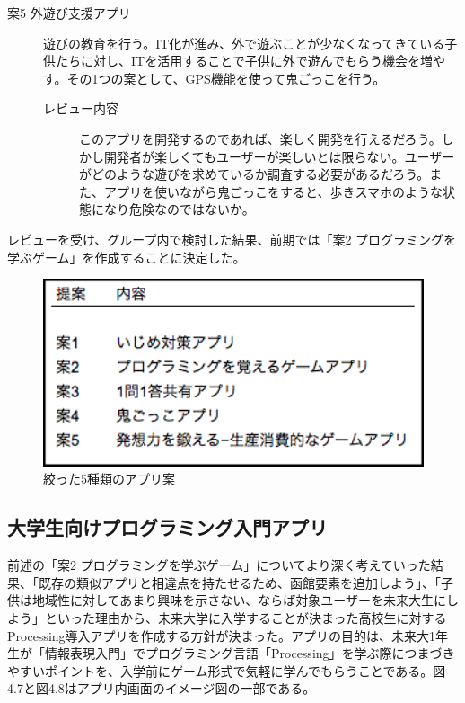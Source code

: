 \documentclass[openany,11pt,papersize]{jsbook}
\begin{document}
\begin{description}
 \item[案5 外遊び支援アプリ]
遊びの教育を行う。IT化が進み、外で遊ぶことが少なくなってきている子供たちに対し、ITを活用することで子供に外で遊んでもらう機会を増やす。その1つの案として、GPS機能を使って鬼ごっこを行う。
	\begin{description}
 	\item[レビュー内容]
	このアプリを開発するのであれば、楽しく開発を行えるだろう。しかし開発者が楽しくてもユーザーが楽しいとは限らない。ユーザーがどのような遊びを求めているか調査する必要があるだろう。また、アプリを使いながら鬼ごっこをすると、歩きスマホのような状態になり危険なのではないか。
	 \end{description}

 \end{description}
 
 \par レビューを受け、グループ内で検討した結果、前期では「案2 プログラミングを学ぶゲーム」を作成することに決定した。
 
 \begin{figure}[H]
\begin{center}
\includegraphics[width=12cm, bb=0 0 329 162]{img/AppIdea.png}
\end{center}
\caption{絞った5種類のアプリ案}
\end{figure}
 
 
 \subsection{大学生向けプログラミング入門アプリ}
\par 前述の「案2 プログラミングを学ぶゲーム」についてより深く考えていった結果、「既存の類似アプリと相違点を持たせるため、函館要素を追加しよう」、「子供は地域性に対してあまり興味を示さない、ならば対象ユーザーを未来大生にしよう」といった理由から、未来大学に入学することが決まった高校生に対するProcessing導入アプリを作成する方針が決まった。アプリの目的は、未来大1年生が「情報表現入門」でプログラミング言語「Processing」を学ぶ際につまづきやすいポイントを、入学前にゲーム形式で気軽に学んでもらうことである。図4.7と図4.8はアプリ内画面のイメージ図の一部である。
\end{document}
